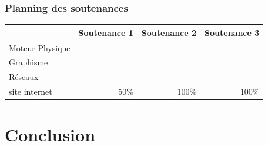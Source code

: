 \documentclass [11pt]{report}
\begin{document}
	\subsection{Planning des soutenances}
		\begin{tabular}{| l | * {3}{r |}}
		\hline
		 & Soutenance 1 & Soutenance 2 & Soutenance 3 \\
		\hline
		Moteur Physique & & & \\
		\hline
		 Graphisme & & & \\
		\hline
		Réseaux & & & \\
		\hline
		site internet & 50\% & 100\%  & 100\%  \\
	           \hline
		\end{tabular}
\chapter {Conclusion}
\end{document}
